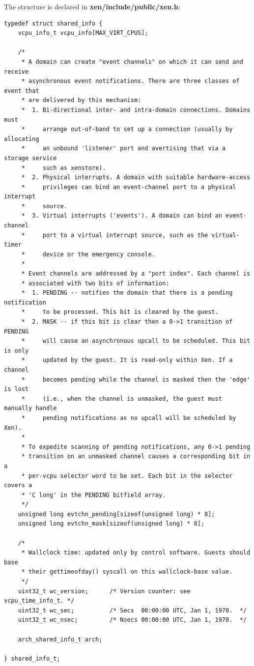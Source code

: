 \documentclass[11pt,twoside,final,openright]{report}
\begin{document}
The structure is declared in {\bf xen/include/public/xen.h}:

\scriptsize
\begin{verbatim}
typedef struct shared_info {
    vcpu_info_t vcpu_info[MAX_VIRT_CPUS];

    /*
     * A domain can create "event channels" on which it can send and receive
     * asynchronous event notifications. There are three classes of event that
     * are delivered by this mechanism:
     *  1. Bi-directional inter- and intra-domain connections. Domains must
     *     arrange out-of-band to set up a connection (usually by allocating
     *     an unbound 'listener' port and avertising that via a storage service
     *     such as xenstore).
     *  2. Physical interrupts. A domain with suitable hardware-access
     *     privileges can bind an event-channel port to a physical interrupt
     *     source.
     *  3. Virtual interrupts ('events'). A domain can bind an event-channel
     *     port to a virtual interrupt source, such as the virtual-timer
     *     device or the emergency console.
     * 
     * Event channels are addressed by a "port index". Each channel is
     * associated with two bits of information:
     *  1. PENDING -- notifies the domain that there is a pending notification
     *     to be processed. This bit is cleared by the guest.
     *  2. MASK -- if this bit is clear then a 0->1 transition of PENDING
     *     will cause an asynchronous upcall to be scheduled. This bit is only
     *     updated by the guest. It is read-only within Xen. If a channel
     *     becomes pending while the channel is masked then the 'edge' is lost
     *     (i.e., when the channel is unmasked, the guest must manually handle
     *     pending notifications as no upcall will be scheduled by Xen).
     * 
     * To expedite scanning of pending notifications, any 0->1 pending
     * transition on an unmasked channel causes a corresponding bit in a
     * per-vcpu selector word to be set. Each bit in the selector covers a
     * 'C long' in the PENDING bitfield array.
     */
    unsigned long evtchn_pending[sizeof(unsigned long) * 8];
    unsigned long evtchn_mask[sizeof(unsigned long) * 8];

    /*
     * Wallclock time: updated only by control software. Guests should base
     * their gettimeofday() syscall on this wallclock-base value.
     */
    uint32_t wc_version;      /* Version counter: see vcpu_time_info_t. */
    uint32_t wc_sec;          /* Secs  00:00:00 UTC, Jan 1, 1970.  */
    uint32_t wc_nsec;         /* Nsecs 00:00:00 UTC, Jan 1, 1970.  */

    arch_shared_info_t arch;

} shared_info_t;
\end{verbatim}
\normalsize
\end{document}
